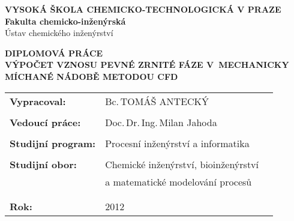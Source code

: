\vspace{20mm}
\begin{center}
{\large \textbf{VYSOKÁ ŠKOLA CHEMICKO-TECHNOLOGICKÁ V PRAZE}\\}
{\large \textbf{Fakulta chemicko-inženýrská}\\
Ústav chemického inženýrství\\}
\vspace{15mm}


\vspace{40mm}

{\huge \textbf{DIPLOMOVÁ PRÁCE\\}}
\vspace{25mm}
{\large \textbf{VÝPOČET VZNOSU PEVNÉ ZRNITÉ FÁZE V~MECHANICKY MÍCHANÉ NÁDOBĚ METODOU CFD\\}}
\end{center}
\vspace{35mm}

\begin{tabular}{p{60mm}lp{50mm}}
\textbf{Vypracoval:} & Bc.\,TOMÁŠ ANTECKÝ\\
\\
\textbf{Vedoucí práce:} & Doc.\,Dr.\,Ing.\,Milan Jahoda \\

\\
\textbf{Studijní program:} & Procesní inženýrství a informatika \\
\\
\textbf{Studijní obor:} & Chemické inženýrství, bioinženýrství  \\
	& a matematické modelování procesů\\
\\
\\
\textbf{Rok:} & 2012 \\
\end{tabular}
